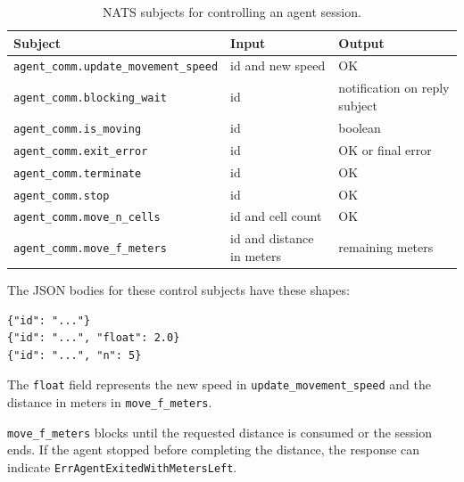 \documentclass[12pt,a4paper]{report}
\begin{document}
\begin{table}[H]
\centering
\small
\begin{tabular}{|p{}|p{}|p{}|}
\hline
\textbf{Subject} & \textbf{Input} & \textbf{Output} \\
\hline
\texttt{agent\_comm.}\newline\texttt{update\_movement\_speed} &
id and new speed &
OK \\
\hline
\texttt{agent\_comm.}\newline\texttt{blocking\_wait} &
id &
notification on reply subject \\
\hline
\texttt{agent\_comm.}\newline\texttt{is\_moving} &
id &
boolean \\
\hline
\texttt{agent\_comm.}\newline\texttt{exit\_error} &
id &
OK or final error \\
\hline
\texttt{agent\_comm.}\newline\texttt{terminate} &
id &
OK \\
\hline
\texttt{agent\_comm.}\newline\texttt{stop} &
id &
OK \\
\hline
\texttt{agent\_comm.}\newline\texttt{move\_n\_cells} &
id and cell count &
OK \\
\hline
\texttt{agent\_comm.}\newline\texttt{move\_f\_meters} &
id and distance in meters &
remaining meters \\
\hline
\end{tabular}
\caption{NATS subjects for controlling an agent session.}
\end{table}

The JSON bodies for these control subjects have these shapes:

\begin{lstlisting}
{"id": "..."}
{"id": "...", "float": 2.0}
{"id": "...", "n": 5}
\end{lstlisting}

The \texttt{float} field represents the new speed in
\texttt{update\_movement\_speed} and the distance in meters in
\texttt{move\_f\_meters}.

\texttt{move\_f\_meters} blocks until the requested distance is consumed or the
session ends. If the agent stopped before completing the distance, the response
can indicate \newline \texttt{ErrAgentExitedWithMetersLeft}.
\end{document}
